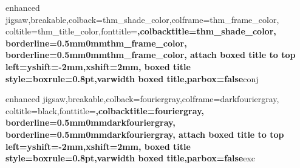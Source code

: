 {enhanced jigsaw,breakable,colback=thm_shade_color,colframe=thm_frame_color,
coltitle=thm_title_color,fonttitle=\bfseries ,colbacktitle=thm_shade_color,
borderline={0.5mm}{0mm}{thm_frame_color},
borderline={0.5mm}{0mm}{thm_frame_color},
attach boxed title to top left={yshift=-2mm,xshift=2mm},
boxed title style={boxrule=0.8pt},varwidth boxed title,parbox=false}{conj}

{enhanced jigsaw,breakable,colback=fouriergray,colframe=darkfouriergray,
coltitle=black,fonttitle=\bfseries ,colbacktitle=fouriergray,
borderline={0.5mm}{0mm}{darkfouriergray},
borderline={0.5mm}{0mm}{darkfouriergray},
attach boxed title to top left={yshift=-2mm,xshift=2mm},
boxed title style={boxrule=0.8pt},varwidth boxed title,parbox=false}{exc}

\renewcommand*\proofname{Beweis}
\makeatletter
\newenvironment{beweis}[1][\proofname]{
	\par
	\pushQED{\qed}%
	\normalfont \topsep6\p@\@plus6\p@\relax
	\trivlist
	\item[\hskip\labelsep
		\bfseries #1\@addpunct{:}]~\newline\ignorespaces
}{
	\popQED\endtrivlist\@endpefalse
	\noindent\ignorespacesafterend
}
\newenvironment{pwoof}[1][\proofname]{
	\par
	\pushQED{\qed}%
	\normalfont \topsep6\p@\@plus6\p@\relax
	\trivlist
	\item[\hskip\labelsep
		\bfseries #1\@addpunct{:}]~\newline\ignorespaces
}{
	\popQED\endtrivlist\@endpefalse
	\noindent\ignorespacesafterend
}
\makeatother



\newsavebox{\informationbox}
\newenvironment{information}
{\begin{center}\begin{lrbox}{\informationbox}\begin{minipage}{0.8\textwidth}\small}
{\end{minipage}\end{lrbox}
\begin{tikzpicture}
\draw[fill] (-0.5*\wd\informationbox - 1cm, - 0.3cm) ellipse (0.3cm and 0.15cm);
\shadedraw[ball color=white] (-0.5*\wd\informationbox -  1cm, 0cm) circle (0.3cm);
\draw[color=black] (-0.5*\wd\informationbox - 1cm + 0.01cm, 0cm) node {\rotatebox{10}{\bfseries i}};

\draw (0,0) node {\usebox{\informationbox}};
\end{tikzpicture}\end{center}
}

